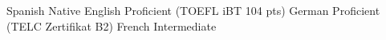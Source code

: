 

\begin{cvskills}

  \cvskillnobreak
    {Spanish} %
    {Native} %
    {English} %
    {Proficient (TOEFL iBT 104 pts)} %
    {German} %
    {Proficient (TELC Zertifikat B2)} %
    {French} %
    {Intermediate} %

\end{cvskills}
